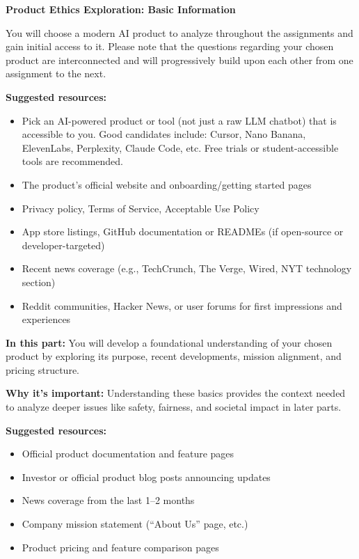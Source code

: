 \item {\bf Product Ethics Exploration: Basic Information}

You will choose a modern AI product to analyze throughout the assignments and gain initial access to it. Please note that the questions regarding your chosen product are interconnected and will progressively build upon each other from one assignment to the next.

\textbf{Suggested resources:}
\begin{itemize}
    \item Pick an AI-powered product or tool (not just a raw LLM chatbot) that is accessible to you. Good candidates include: Cursor, Nano Banana, ElevenLabs, Perplexity, Claude Code, etc. Free trials or student-accessible tools are recommended.
    \item The product's official website and onboarding/getting started pages
    \item Privacy policy, Terms of Service, Acceptable Use Policy
    \item App store listings, GitHub documentation or READMEs (if open-source or developer-targeted)
    \item Recent news coverage (e.g., TechCrunch, The Verge, Wired, NYT technology section)
    \item Reddit communities, Hacker News, or user forums for first impressions and experiences
\end{itemize}

\textbf{In this part:} You will develop a foundational understanding of your chosen product by exploring its purpose, recent developments, mission alignment, and pricing structure.

\vspace{2mm}

\textbf{Why it's important:} Understanding these basics provides the context needed to analyze deeper issues like safety, fairness, and societal impact in later parts.

\vspace{2mm}

\textbf{Suggested resources:}
\begin{itemize}
  \item Official product documentation and feature pages
  \item Investor or official product blog posts announcing updates
  \item News coverage from the last 1--2 months
  \item Company mission statement (``About Us'' page, etc.)
  \item Product pricing and feature comparison pages
\end{itemize}


\begin{enumerate}
    
    
    
    
\end{enumerate}